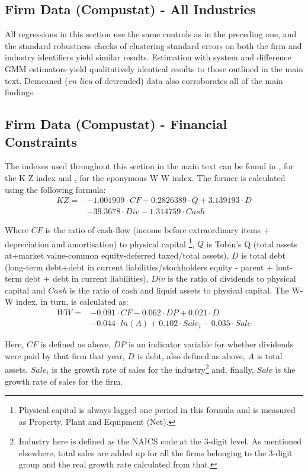\documentclass{_latex/house}
\begin{document}
\subsection{Firm Data (Compustat) - All Industries}
All regressions in this section use the same controls as in the preceding one, and the standard robustness checks of clustering standard errors on both the firm and industry identifiers yield similar results. Estimation with system and difference GMM estimators yield qualitatively identical results to those outlined in the main text. Demeaned (\textit{en lieu} of detrended) data also corroborates all of the main findings.
\subsection{Firm Data (Compustat) - Financial Constraints}
The indexes used throughout this section in the main text can be found in \cite{RePEc:oup:rfinst:v:14:y:2001:i:2:p:529-54}, for the K-Z index and \cite{RePEc:oup:rfinst:v:19:y:2006:i:2:p:531-559}, for the eponymous W-W index. The former is calculated using the following formula:
\begin{align*}
KZ=&-1.001909\cdot CF+0.2826389 \cdot Q+3.139193 \cdot D \\
&-39.3678 \cdot Div-1.314759\cdot Cash
\end{align*}

Where $CF$ is the ratio of cash-flow (income before extraordinary items + depreciation and amortisation) to physical capital \footnote{Physical capital is always lagged one period in this formula and is measured as Property, Plant and Equipment (Net).}, $Q$ is Tobin's Q (total assets at+market value-common equity-deferred taxed/total assets), $D$ is total debt (long-term debt+debt in current liabilities/stockholders equity - parent + lont-term debt + debt in current liabilities), $Div$ is the ratio of dividends to physical capital and $Cash$ is the ratio of cash and liquid assets to physical capital. The W-W index, in turn, is calculated as:
\begin{align*}
WW=&-0.091\cdot CF-0.062\cdot DP+0.021\cdot D \\
&-0.044\cdot ln(A)+0.102\cdot Sale_i-0.035\cdot Sale
\end{align*}

Here, $CF$ is defined as above, $DP$ is an indicator variable for whether dividends were paid by that firm that year, $D$ is debt, also defined as above, $A$ is total assets, $Sale_i$ is the growth rate of sales for the industry\footnote{Industry here is defined as the NAICS code at the 3-digit level. As mentioned elsewhere, total sales are added up for all the firms belonging to the 3-digit group and the real growth rate calculated from that.} and, finally, $Sale$ is the growth rate of sales for the firm.
\end{document}
